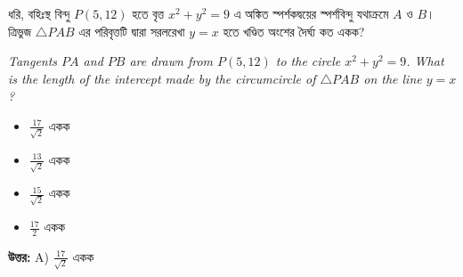 \documentclass[12pt, a4paper]{article}
\begin{document}
\begin{tcolorbox}[questionbox={প্রশ্ন (Question) 3}]
    \noindent
    ধরি, বহিঃস্থ বিন্দু $P(5, 12)$ হতে বৃত্ত $x^2 + y^2 = 9$ এ অঙ্কিত স্পর্শকদ্বয়ের স্পর্শবিন্দু যথাক্রমে $A$ ও $B$। ত্রিভুজ $\triangle PAB$ এর পরিবৃত্তটি দ্বারা সরলরেখা $y = x$ হতে খণ্ডিত অংশের দৈর্ঘ্য কত একক?
    
    \vspace{0.8em}
    \begin{english}
    \noindent\textit{\color{darkgray}
    Tangents $PA$ and $PB$ are drawn from $P(5, 12)$ to the circle $x^2 + y^2 = 9$. What is the length of the intercept made by the circumcircle of $\triangle PAB$ on the line $y = x$?
    }
    \end{english}
\end{tcolorbox}

\begin{itemize}[label={}, leftmargin=1cm, itemsep=0.5em]
    \item[\textbf{A)}] $\frac{17}{\sqrt{2}}$ একক
    \item[\textbf{B)}] $\frac{13}{\sqrt{2}}$ একক
    \item[\textbf{C)}] $\frac{15}{\sqrt{2}}$ একক
    \item[\textbf{D)}] $\frac{17}{2}$ একক
\end{itemize}

\vspace{0.5em}
\begin{tcolorbox}[answerbox]
    \textbf{\color{success} উত্তর:} A) $\frac{17}{\sqrt{2}}$ একক
\end{tcolorbox}
\vspace{1em}
\end{document}
